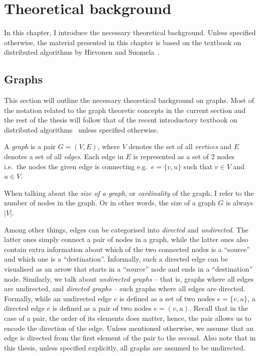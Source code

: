 \chapter{Theoretical background}
\label{chapter:background}

In this chapter, I introduce the necessary theoretical background. Unless specified otherwise,
the material presented in this chapter is based on the textbook on distributed algorithms by Hirvonen and Suomela~\cite{Hirvonen2020}.

\section{Graphs}

This section will outline the necessary theoretical background on graphs. 
Most of the notation related to the graph theoretic concepts in the current
section and the rest of the thesis will follow that of
the recent introductory textbook on distributed algorithms~\cite{Hirvonen2020}
unless specified otherwise.

A \emph{graph} is a pair $G = (V, E)$, where $V$ denotes the set of all \emph{vertices}
and $E$ denotes a set of all \emph{edges}. Each edge in $E$ is represented as a set of
2 nodes i.e.\ the nodes the given edge is connecting e.g.\ $e = \{v, u\}$ such that 
$v \in V$ and $u \in V$.

When talking about the \emph{size of a graph}, or \emph{cardinality} of the graph, I refer
to the number of nodes in the graph. Or in other words, the size of a graph $G$
is always $|V|$.

Among other things, edges can be categorised into \emph{directed} and \emph{undirected}.
The latter ones simply connect a pair of nodes in a graph, while the latter
ones also contain extra information about which of the two connected nodes is
a ``source'' and which one is a ``destination''. Informally, such a directed edge
can be visualised as an arrow that starts in a ``source'' node and ends in a 
``destination'' node.  Similarly, we talk about \emph{undirected graphs} -- that is, graphs
where all edges are undirected, and \emph{directed graphs} -- such graphs where all
edges are directed. Formally, while an undirected edge $e$ is defined as a
set of two nodes $e = \{v, u\}$, a directed edge $e$ is defined as a pair
of two nodes $e = (v, u)$. Recall that in the case of a pair, the order of its
elements does matter, hence, the pair allows us to encode the direction of
the edge. Unless mentioned otherwise, we assume that an edge is directed
from the first element of the pair to the second. Also note that in this
thesis, unless specified explicitly, all graphs are assumed to be undirected.

